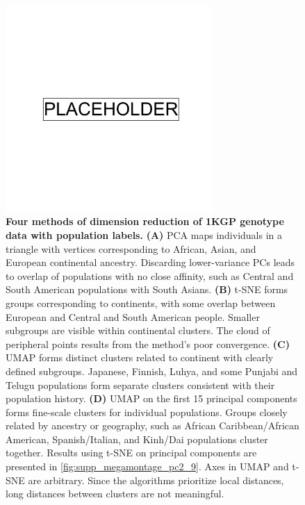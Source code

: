 \begin{figure}[!ht]
    \centering
    \includegraphics[width=0.7\textwidth]{placeholder.png}
    \caption[Four methods of dimension reduction of 1KGP genotype data]{\textbf{Four methods of dimension reduction of 1KGP genotype data with population labels.} \textbf{(A)} PCA maps individuals in a triangle with vertices corresponding to African, Asian, and European continental ancestry. Discarding lower-variance PCs leads to overlap of populations with no close affinity, such as Central and South American populations with South Asians. \textbf{(B)} t-SNE forms groups corresponding to continents, with some overlap between European and Central and South American people. Smaller subgroups are visible within continental clusters. The cloud of peripheral points results from the method's poor convergence. \textbf{(C)} UMAP forms distinct clusters related to continent with clearly defined subgroups. Japanese, Finnish, Luhya, and some Punjabi and Telugu populations form separate clusters consistent with their population history\citep{10002015global}. \textbf{(D)} UMAP on the first 15 principal components forms fine-scale clusters for individual populations. Groups closely related by ancestry or geography, such as African Caribbean/African American, Spanish/Italian, and Kinh/Dai populations cluster together. Results using t-SNE on principal components are presented in \ref{fig:supp_megamontage_pc2_9}. Axes in UMAP and t-SNE are arbitrary. Since the algorithms prioritize local distances, long distances between clusters are not meaningful.}
    \label{fig:fig1}
\end{figure}

